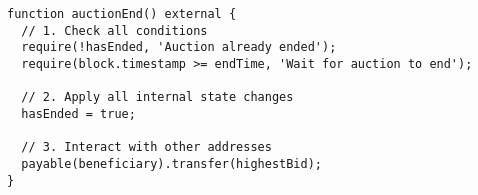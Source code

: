 \begin{lstlisting}[language=Solidity]
function auctionEnd() external {
  // 1. Check all conditions
  require(!hasEnded, 'Auction already ended');
  require(block.timestamp >= endTime, 'Wait for auction to end');
  
  // 2. Apply all internal state changes
  hasEnded = true;
  
  // 3. Interact with other addresses
  payable(beneficiary).transfer(highestBid);
}
\end{lstlisting}